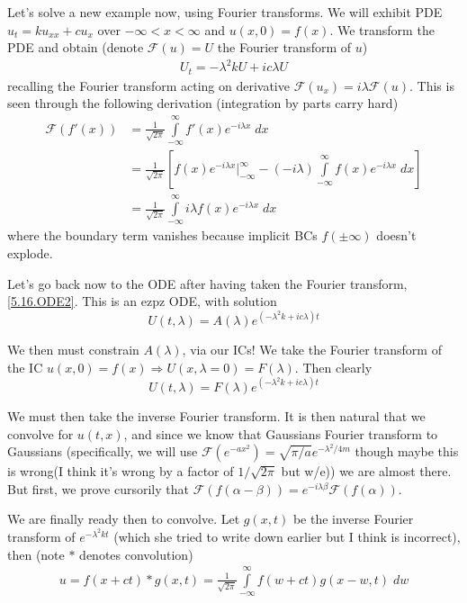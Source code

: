 \documentclass[10pt]{report}
\begin{document}
Let's solve a new example now, using Fourier transforms. We will exhibit PDE $u_t = ku_{xx} + cu_x$ over $-\infty < x < \infty$ and $u(x,0) = f(x)$. We transform the PDE and obtain (denote $\mathcal{F}(u) = U$ the Fourier transform of $u$)
\begin{align}
    U_t = -\lambda^2 kU + ic\lambda U\label{5.16.ODE2}
\end{align}
recalling the Fourier transform acting on derivative $\mathcal{F}(u_x) = i\lambda \mathcal{F}(u)$. This is seen through the following derivation (integration by parts carry hard)
\begin{align}
    \mathcal{F}(f'(x)) &= \frac{1}{\sqrt{2\pi}}\int\limits_{-\infty}^{\infty}f'(x)e^{-i\lambda x}\;dx\\
    &= \frac{1}{\sqrt{2\pi}}\left[ f(x)e^{-i\lambda x}\Bigg|_{-\infty}^\infty - (-i\lambda)\int\limits_{-\infty}^{\infty}f(x)e^{-i\lambda x}\;dx \right]\\
    &= \frac{1}{\sqrt{2\pi}}\int\limits_{-\infty}^{\infty}i\lambda f(x)e^{-i\lambda x}\;dx
\end{align}
where the boundary term vanishes because implicit BCs $f(\pm \infty)$ doesn't explode. 

Let's go back now to the ODE after having taken the Fourier transform, \eqref{5.16.ODE2}. This is an ezpz ODE, with solution
\begin{equation}
    U(t,\lambda) = A(\lambda)e^{(-\lambda^2k + ic\lambda)t}
\end{equation}

We then must constrain $A(\lambda)$, via our ICs! We take the Fourier transform of the IC $u(x,0) = f(x) \Rightarrow U(x,\lambda = 0) = F(\lambda)$. Then clearly
\begin{equation}
    U(t,\lambda) = F(\lambda)e^{(-\lambda^2k + ic\lambda)t}
\end{equation}

We must then take the inverse Fourier transform. It is then natural that we convolve for $u(t,x)$, and since we know that Gaussians Fourier transform to Gaussians (specifically, we will use $\mathcal{F}(e^{-ax^2}) = \sqrt{\pi/a}e^{-\lambda^2/4m}$ though maybe this is wrong(I think it's wrong by a factor of $1/\sqrt{2\pi}$ but w/e)) we are almost there. But first, we prove cursorily that $\mathcal{F}(f(\alpha - \beta)) = e^{-i\lambda \beta}\mathcal{F}(f(\alpha))$. 

We are finally ready then to convolve. Let $g(x,t)$ be the inverse Fourier transform of $e^{-\lambda^2 kt}$ (which she tried to write down earlier but I think is incorrect), then (note $*$ denotes convolution)
\begin{align}
    u = f(x + ct)*g(x,t) = \frac{1}{\sqrt{2\pi}}\int\limits_{-\infty}^{\infty}f(w + ct) g(x-w,t)\;dw
\end{align}
\end{document}
